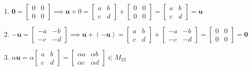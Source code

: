 \documentclass{report}
\begin{document}
\begin{enumerate}
    \item $\bm{0} =
    \begin{bmatrix}
        0 & 0 \\
        0 & 0 
    \end{bmatrix} \implies \bm{u} + 0 =
    \begin{bmatrix}
        a & b \\
        c & d 
    \end{bmatrix}
    +
    \begin{bmatrix}
        0 & 0 \\
        0 & 0 
    \end{bmatrix}
    =
    \begin{bmatrix}
        a & b \\
        c & d
    \end{bmatrix}
    =
    \bm{u}
    $

    \item $-\bm{u} =
    \begin{bmatrix}
        -a & -b \\
        -c & -d
    \end{bmatrix}
    \implies \bm{u} + (-\bm{u}) = 
    \begin{bmatrix}
        a & b \\
        c & d
    \end{bmatrix}
    +
    \begin{bmatrix}
        -a & -b \\
        -c & -d
    \end{bmatrix}
    =
    \begin{bmatrix}
        0 & 0 \\
        0 & 0 
    \end{bmatrix}
    = \bm{0}
    $

    \item $\alpha \bm{u}  = \alpha 
    \begin{bmatrix}
        a & b \\
        c & d
    \end{bmatrix}
    =
    \begin{bmatrix}
        \alpha a & \alpha b \\
        \alpha c & \alpha d
    \end{bmatrix}
    \in M_{22}$


\end{enumerate}
\end{document}
